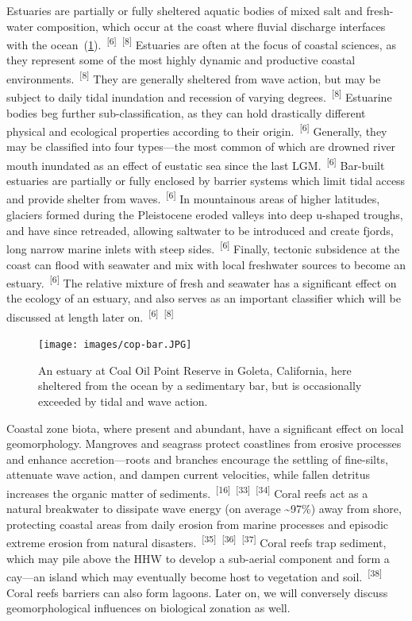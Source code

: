 \documentclass{article}
\begin{document}
\par{Estuaries are partially or fully sheltered aquatic bodies of mixed salt and fresh-water composition, which occur at the coast where fluvial discharge interfaces with the ocean~(\cref{figure11}).~\textsuperscript{[6]}~\textsuperscript{[8]} Estuaries are often at the focus of coastal sciences, as they represent some of the most highly dynamic and productive coastal environments.~\textsuperscript{[8]} They are generally sheltered from wave action, but may be subject to daily tidal inundation and recession of varying degrees.~\textsuperscript{[8]} Estuarine bodies beg further sub-classification, as they can hold drastically different physical and ecological properties according to their origin.~\textsuperscript{[6]} Generally, they may be classified into four types---the most common of which are drowned river mouth inundated as an effect of eustatic sea since the last LGM.~\textsuperscript{[6]} Bar-built estuaries are partially or fully enclosed by barrier systems which limit tidal access and provide shelter from waves.~\textsuperscript{[6]} In mountainous areas of higher latitudes, glaciers formed during the Pleistocene eroded valleys into deep u-shaped troughs, and have since retreaded, allowing saltwater to be introduced and create fjords, long narrow marine inlets with steep sides.~\textsuperscript{[6]} Finally, tectonic subsidence at the coast can flood with seawater and mix with local freshwater sources to become an estuary.~\textsuperscript{[6]} The relative mixture of fresh and seawater has a significant effect on the ecology of an estuary, and also serves as an important classifier which will be discussed at length later on.~\textsuperscript{[6]}~\textsuperscript{[8]}}

\begin{figure}
    \centering
    \texttt{[image: images/cop-bar.JPG]}
    \caption{An estuary at Coal Oil Point Reserve in Goleta, California, here sheltered from the ocean by a sedimentary bar, but is occasionally exceeded by tidal and wave action.}
    \label{figure11}
\end{figure}

\par{Coastal zone biota, where present and abundant, have a significant effect on local geomorphology. Mangroves and seagrass protect coastlines from erosive processes and enhance accretion---roots and branches encourage the settling of fine-silts, attenuate wave action, and dampen current velocities, while fallen detritus increases the organic matter of sediments.~\textsuperscript{[16]}~\textsuperscript{[33]}~\textsuperscript{[34]} Coral reefs act as a natural breakwater to dissipate wave energy (on average \textasciitilde97\%) away from shore, protecting coastal areas from daily erosion from marine processes and episodic extreme erosion from natural disasters.~\textsuperscript{[35]}~\textsuperscript{[36]}~\textsuperscript{[37]} Coral reefs trap sediment, which may pile above the HHW to develop a sub-aerial component and form a cay---an island which may eventually become host to vegetation and soil.~\textsuperscript{[38]} Coral reefs barriers can also form lagoons. Later on, we will conversely discuss geomorphological influences on biological zonation as well.  }
\end{document}
